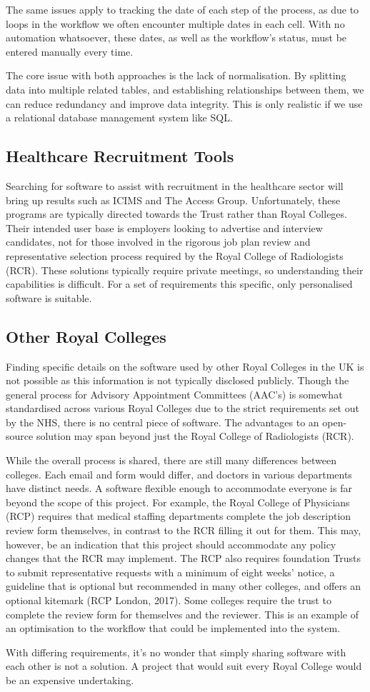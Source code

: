 The same issues apply to tracking the date of each step of the process, as due to loops in the workflow we often encounter multiple dates in each cell. With no automation whatsoever, these dates, as well as the workflow’s status, must be entered manually every time.

The core issue with both approaches is the lack of normalisation. By splitting data into multiple related tables, and establishing relationships between them, we can reduce redundancy and improve data integrity. This is only realistic if we use a relational database management system like SQL.

\subsection{Healthcare Recruitment Tools}
Searching for software to assist with recruitment in the healthcare sector will bring up results such as ICIMS and The Access Group. Unfortunately, these programs are typically directed towards the Trust rather than Royal Colleges. Their intended user base is employers looking to advertise and interview candidates, not for those involved in the rigorous job plan review and representative selection process required by the Royal College of Radiologists (RCR). These solutions typically require private meetings, so understanding their capabilities is difficult. For a set of requirements this specific, only personalised software is suitable.

\subsection{Other Royal Colleges}
Finding specific details on the software used by other Royal Colleges in the UK is not possible as this information is not typically disclosed publicly. Though the general process for Advisory Appointment Committees (AAC’s) is somewhat standardised across various Royal Colleges due to the strict requirements set out by the NHS, there is no central piece of software. The advantages to an open-source solution may span beyond just the Royal College of Radiologists (RCR). 

While the overall process is shared, there are still many differences between colleges. Each email and form would differ, and doctors in various departments have distinct needs. A software flexible enough to accommodate everyone is far beyond the scope of this project. For example, the Royal College of Physicians (RCP) requires that medical staffing departments complete the job description review form themselves, in contrast to the RCR filling it out for them. This may, however, be an indication that this project should accommodate any policy changes that the RCR may implement. The RCP also requires foundation Trusts to submit representative requests with a minimum of eight weeks’ notice, a guideline that is optional but recommended in many other colleges, and offers an optional kitemark (RCP London, 2017). Some colleges require the trust to complete the review form for themselves and the reviewer. This is an example of an optimisation to the workflow that could be implemented into the system.

With differing requirements, it’s no wonder that simply sharing software with each other is not a solution. A project that would suit every Royal College would be an expensive undertaking.